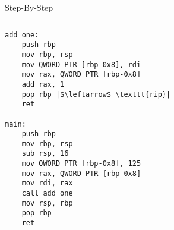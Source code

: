 \documentclass[hyphens,aspectratio=169]{beamer}
\begin{document}
\begin{frame}[fragile]{Step-By-Step}
    \begin{columns}
        \begin{column}{0.33\textwidth}
            \begin{verbatim}
add_one:
    push rbp
    mov rbp, rsp
    mov QWORD PTR [rbp-0x8], rdi
    mov rax, QWORD PTR [rbp-0x8]
    add rax, 1
    pop rbp |$\leftarrow$ \texttt{rip}|
    ret

main:
    push rbp
    mov rbp, rsp
    sub rsp, 16
    mov QWORD PTR [rbp-0x8], 125
    mov rax, QWORD PTR [rbp-0x8]
    mov rdi, rax
    call add_one
    mov rsp, rbp
    pop rbp
    ret
            \end{verbatim}
        \end{column}
        \begin{column}{0.33\textwidth}
\end{column}
\end{columns}
\end{frame}
\end{document}
